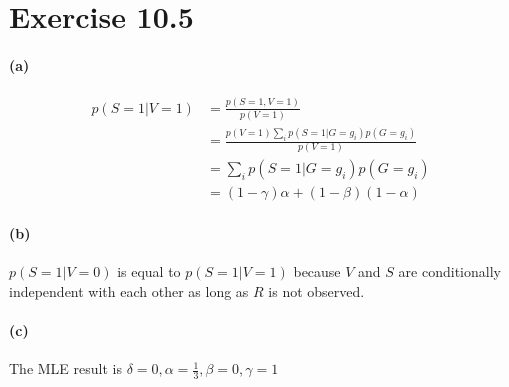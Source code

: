 \documentclass[11pt, letterpaper]{article}
\begin{document}
\section{Exercise 10.5}
\paragraph{(a)}
\begin{align*}
    p(S=1|V=1) &= \frac{p(S=1, V=1)}{p(V=1)} \\
        &= \frac{p(V=1) \sum_i p(S=1|G=g_i)p(G=g_i)}{p(V=1)} \\
        &= \sum_i p(S=1|G=g_i)p(G=g_i) \\
        &= (1-\gamma)\alpha + (1-\beta)(1-\alpha)
\end{align*}

\paragraph{(b)}
$p(S=1|V=0)$ is equal to $p(S=1|V=1)$ because $V$ and $S$ are conditionally independent with each other as long as $R$ is not observed.

\paragraph{(c)}
The MLE result is $\delta=0, \alpha=\frac{1}{3}, \beta=0, \gamma=1$
\end{document}
